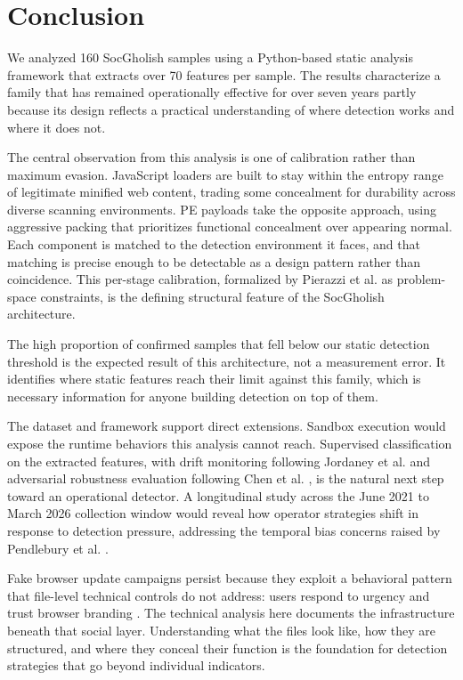 \documentclass[pdflatex,sn-mathphys-num]{sn-jnl}
\theoremstyle{thmstyleone}%
\theoremstyle{thmstyletwo}%
\theoremstyle{thmstylethree}%
\begin{document}
\section{Conclusion}\label{sec:conclusion}

We analyzed 160 SocGholish samples using a Python-based static analysis framework that extracts over 70 features per sample. The results characterize a family that has remained operationally effective for over seven years partly because its design reflects a practical understanding of where detection works and where it does not.

The central observation from this analysis is one of calibration rather than maximum evasion. JavaScript loaders are built to stay within the entropy range of legitimate minified web content, trading some concealment for durability across diverse scanning environments. PE payloads take the opposite approach, using aggressive packing that prioritizes functional concealment over appearing normal. Each component is matched to the detection environment it faces, and that matching is precise enough to be detectable as a design pattern rather than coincidence. This per-stage calibration, formalized by Pierazzi et al. \cite{pierazzi2020} as problem-space constraints, is the defining structural feature of the SocGholish architecture.

The high proportion of confirmed samples that fell below our static detection threshold is the expected result of this architecture, not a measurement error. It identifies where static features reach their limit against this family, which is necessary information for anyone building detection on top of them.

The dataset and framework support direct extensions. Sandbox execution would expose the runtime behaviors this analysis cannot reach. Supervised classification on the extracted features, with drift monitoring following Jordaney et al. \cite{jordaney2017} and adversarial robustness evaluation following Chen et al. \cite{chen2018}, is the natural next step toward an operational detector. A longitudinal study across the June 2021 to March 2026 collection window would reveal how operator strategies shift in response to detection pressure, addressing the temporal bias concerns raised by Pendlebury et al. \cite{pendlebury2019}.

Fake browser update campaigns persist because they exploit a behavioral pattern that file-level technical controls do not address: users respond to urgency and trust browser branding \cite{cialdini2001, ferreira2015}. The technical analysis here documents the infrastructure beneath that social layer. Understanding what the files look like, how they are structured, and where they conceal their function is the foundation for detection strategies that go beyond individual indicators.
\end{document}

